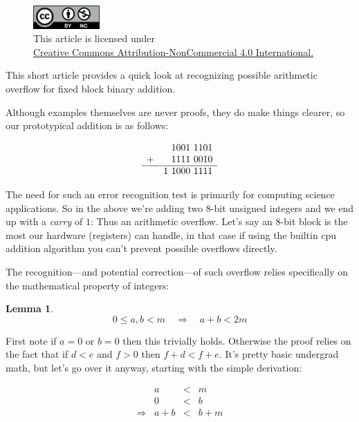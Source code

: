 \documentclass[twoside]{article}
\newtheorem{lemma}{Lemma}[section]
\begin{document}
\begin{figure}[h]
\centering
\includegraphics[width=1in]{../../../cc-by-nc.png}\\[0.1in]
\tiny This article is licensed under \\
\href{http://creativecommons.org/licenses/by-nc/4.0/}
{Creative Commons Attribution-NonCommercial 4.0 International.}\\[0.3in]
\end{figure}

This short article provides a quick look at recognizing possible arithmetic overflow for fixed block binary addition.

Although examples themselves are never proofs, they do make things clearer, so our prototypical addition is as follows:

$$ \begin{array}{rr}
   & 1001\ 1101 \\
 + & 1111\ 0010 \\\hline
   & 1\ 1000\ 1111
\end{array} $$

The need for such an error recognition test is primarily for computing science applications.
So in the above we're adding two 8-bit unsigned integers and we end up with a \emph{carry} of $ 1 $:
Thus an arithmetic overflow. Let's say an 8-bit block is the most our hardware (registers) can handle,
in that case if using the builtin cpu addition algorithm you can't prevent possible overflows directly.

The recognition---and potential correction---of such overflow relies specifically on the
mathematical property of integers:

\begin{lemma} $$ 0\leq a,b < m\quad\Longrightarrow\quad a+b < 2m $$
\end{lemma}

First note if $ a=0 $ or $ b=0 $ then this trivially holds. Otherwise the proof relies on the fact that
if $ d < e $ and $ f > 0 $ then $ f+d < f+e $. It's pretty basic undergrad math, but let's go over it anyway,
starting with the simple derivation:

$$ \begin{array}{lrcl}
 & a & < & m \\
 & 0 & < & b \\
\Longrightarrow & a+b & < & b+m
\end{array} $$
\end{document}
